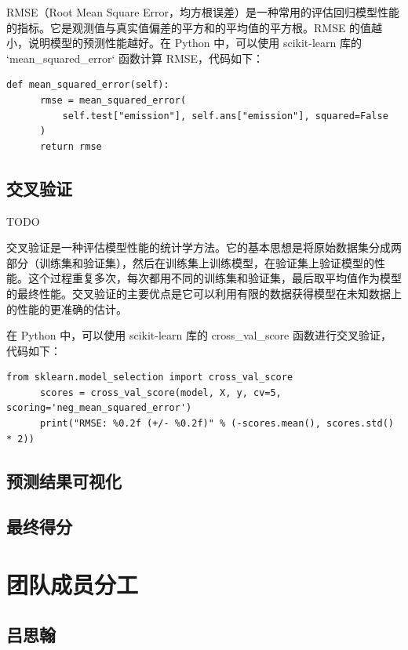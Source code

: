 \documentclass{ctexart}
\begin{document}
RMSE（Root Mean Square Error，均方根误差）是一种常用的评估回归模型性能的指标。它是观测值与真实值偏差的平方和的平均值的平方根。RMSE 的值越小，说明模型的预测性能越好。在 Python 中，可以使用 scikit-learn 库的 `mean\_squared\_error` 函数计算 RMSE，代码如下：

\begin{lstlisting}[style=Python]
      def mean_squared_error(self):
      rmse = mean_squared_error(
          self.test["emission"], self.ans["emission"], squared=False
      )
      return rmse
\end{lstlisting}

\subsection{交叉验证}

TODO

交叉验证是一种评估模型性能的统计学方法。它的基本思想是将原始数据集分成两部分（训练集和验证集），然后在训练集上训练模型，在验证集上验证模型的性能。这个过程重复多次，每次都用不同的训练集和验证集，最后取平均值作为模型的最终性能。交叉验证的主要优点是它可以利用有限的数据获得模型在未知数据上的性能的更准确的估计。

在 Python 中，可以使用 scikit-learn 库的 cross\_val\_score 函数进行交叉验证，代码如下：

\begin{lstlisting}[style=Python]
      from sklearn.model_selection import cross_val_score
      scores = cross_val_score(model, X, y, cv=5, scoring='neg_mean_squared_error')
      print("RMSE: %0.2f (+/- %0.2f)" % (-scores.mean(), scores.std() * 2))
\end{lstlisting}

\subsection{预测结果可视化}

\subsection{最终得分}



\section{团队成员分工}

\subsection{吕思翰}
\end{document}
